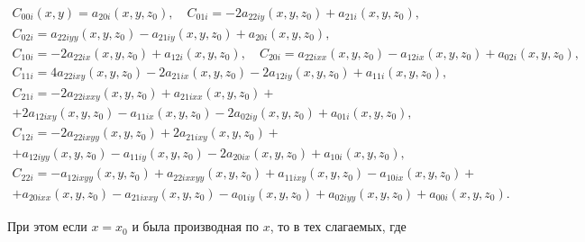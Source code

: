 \begin{gather*} 


C_{00i}(x,y)=a_{20i}(x,y,z_0),\quad 


C_{01i}=-2a_{22iy}(x,y,z_0)+a_{21i}(x,y,z_0), \\ 


% 


C_{02i}=a_{22iyy}(x,y,z_0)-a_{21iy}(x,y,z_0)+ 


a_{20i}(x,y,z_0), \\ 


% 


C_{10i}=-2a_{22ix}(x,y,z_0)+a_{12i}(x,y,z_0),\quad 


C_{20i}=a_{22ixx}(x,y,z_0)-a_{12ix}(x,y,z_0)+ 


a_{02i}(x,y,z_0),\\ 


% 


C_{11i}=4a_{22ixy}(x,y,z_0)-2a_{21ix}(x,y,z_0)- 


2a_{12iy}(x,y,z_0)+a_{11i}(x,y,z_0),\\ 


% 


C_{21i}=-2a_{22ixxy}(x,y,z_0)+a_{21ixx}(x,y,z_0)+ \\+


2a_{12ixy}(x,y,z_0)-a_{11ix}(x,y,z_0)- 


2a_{02iy}(x,y,z_0)+a_{01i}(x,y,z_0), \\ 


% 


C_{12i}=-2a_{22ixyy}(x,y,z_0)+2a_{21ixy}(x,y,z_0)+ \\+


a_{12iyy}(x,y,z_0)-a_{11iy}(x,y,z_0)-2a_{20ix}(x,y,z_0) 


+a_{10i}(x,y,z_0), \\ 


% 


C_{22i}=-a_{12ixyy}(x,y,z_0)+a_{22ixxyy}(x,y,z_0)+ 


a_{11ixy}(x,y,z_0)-a_{10ix}(x,y,z_0)+ \\ 


% 


+a_{20ixx}(x,y,z_0)-a_{21ixxy}(x,y,z_0)-a_{01iy}(x,y,z_0)+ 


a_{02iyy}(x,y,z_0)+a_{00i}(x,y,z_0). 


\end{gather*} 


При этом если $x=x_0$ и была производная по $x$, то в тех слагаемых, где 


